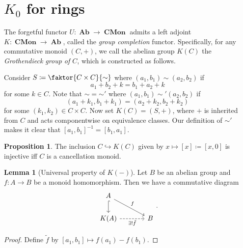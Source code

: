 \documentclass[10pt,letterpaper,cm]{nupset}
\theoremstyle{definition}
\theoremstyle{theorem}
\newtheorem{lemma}[definition]{Lemma}
\newtheorem{prop}[definition]{Proposition}
\theoremstyle{remark}
\newcommand{\1}{\mathbf{1}}
\newcommand{\0}{\vec 0}
\DeclareMathOperator{\Ab}{\mathbf{Ab}}
\DeclareMathOperator{\Cmon}{\mathbf{CMon}}
\begin{document}
\begin{abstract}
We begin low-dimensional $K$-theory, which consists of the groups $K_0(-)$, $K_1(-)$, and $K_2(-)$. Specifically, we describe $K_0$ for rings and for topological spaces. The main sources for this talk are the following.
\begin{itemize}
\item $n$Lab.
\item Charles Weibel's \textit{The $K$-book: an introduction to algebraic $K$-theory}, Chapters I and II.
\item Eric M. Friedlander's \textit{An Introduction to $K$-theory}, Chapter 1.
\end{itemize}
\end{abstract}

\smallskip

\section{$K_0$ for rings}

The forgetful functor $U: \Ab \to \Cmon$ admits a left adjoint $K: \Cmon \to \Ab$, called the \textit{group completion} functor. Specifically, for any commutative monoid $\left(C, +\right)$, we call the abelian group $K(C)$ the \textit{Grothendieck group of $C$}, which is constructed as follows.

\medskip

 Consider $S\coloneqq \faktor{C \times C}{\sim}$ where $(a_1, b_1) \sim (a_2, b_2)$ if $$a_1 + b_2 +k = b_1 + a_2 +k$$ for some $k\in C$. Note that $\sim = {\sim'}$ where $(a_1, b_1) \sim' (a_2, b_2)$ if $$\left(a_1 + k_1, b_1 + k_1\right) = \left(a_2 +k_2, b_2 + k_2\right)$$ for some $\left(k_1, k_2\right) \in C\times C$. Now set $K(C) = \left(S, +\right)$, where $+$ is inherited from $C$ and acts componentwise on equivalence classes. Our definition of ${\sim'}$ makes it clear that $\left[a_1, b_1\right]^{{-1}} = \left[b_1, a_1\right]$.

\begin{prop}
The inclusion $C \hookrightarrow K(C)$ given by $x \mapsto \left[x\right]\coloneqq \left[x, 0\right]$ is injective iff $C$ is a cancellation monoid.
\end{prop}

\begin{lemma}[Universal property of $K({-})$] 
Let $B$ be an abelian group and $f: A \to B$ be a monoid homomorphism. Then we have a commutative diagram 
\[
\begin{tikzcd}[column sep=large]
A \arrow[rd, "f"] \arrow[d, hook] &  \\
K(A) \arrow[swap, r, "\exists! \tilde{f}", dashed] & B
\end{tikzcd}.
\]
\end{lemma}
\begin{proof}
Define $\tilde{f}$ by $\left[a_1, b_1\right]\mapsto f(a_1) - f(b_1)$.
\end{proof}
\end{document}
